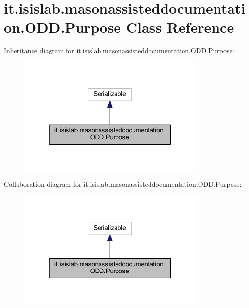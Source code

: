 \hypertarget{classit_1_1isislab_1_1masonassisteddocumentation_1_1_o_d_d_1_1_purpose}{\section{it.\-isislab.\-masonassisteddocumentation.\-O\-D\-D.\-Purpose Class Reference}
\label{classit_1_1isislab_1_1masonassisteddocumentation_1_1_o_d_d_1_1_purpose}
}


Inheritance diagram for it.\-isislab.\-masonassisteddocumentation.\-O\-D\-D.\-Purpose\-:\nopagebreak
\begin{figure}[H]
\begin{center}
\leavevmode
\includegraphics[width=268pt]{classit_1_1isislab_1_1masonassisteddocumentation_1_1_o_d_d_1_1_purpose__inherit__graph}
\end{center}
\end{figure}


Collaboration diagram for it.\-isislab.\-masonassisteddocumentation.\-O\-D\-D.\-Purpose\-:\nopagebreak
\begin{figure}[H]
\begin{center}
\leavevmode
\includegraphics[width=268pt]{classit_1_1isislab_1_1masonassisteddocumentation_1_1_o_d_d_1_1_purpose__coll__graph}
\end{center}
\end{figure}
